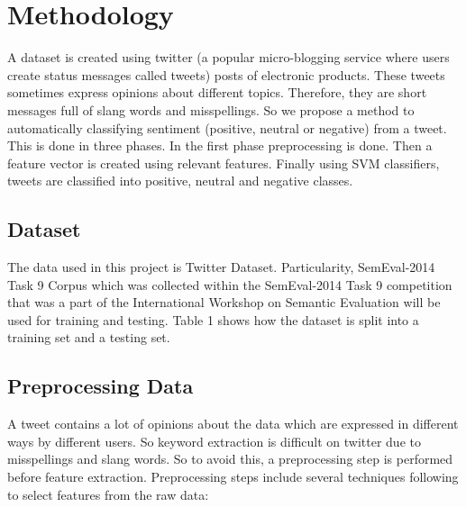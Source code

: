 \section{Methodology}
\label{sec: Methodology}


A dataset is created using twitter (a popular micro-blogging service where users create status messages called tweets) posts of electronic products. These tweets sometimes express opinions about different topics. Therefore, they are short messages full of slang words and misspellings.  So we propose a method to automatically classifying sentiment (positive, neutral or negative) from a tweet. This is done in three phases. In the first phase preprocessing is done. Then a feature vector is created using relevant features. Finally using SVM classifiers, tweets are classified into positive, neutral and negative classes. 

\subsection{Dataset}
\label{sec: Dataset}

The data used in this project is Twitter Dataset. Particularity, SemEval-2014 Task 9 Corpus \cite{nakov2016evaluation} which was collected within the SemEval-2014 Task 9 competition that was a part of the International Workshop on Semantic Evaluation will be used for training and testing. Table 1 shows how the dataset is split into a training set and a testing set.


\subsection{Preprocessing Data}
\label{sec: Preprocessing Data}

A tweet contains a lot of opinions about the data which are expressed in different ways by different users. So keyword extraction is difficult on twitter due to misspellings and slang words. So to avoid this, a preprocessing step is performed before feature extraction. Preprocessing steps include several techniques following to select features from the raw data: 

